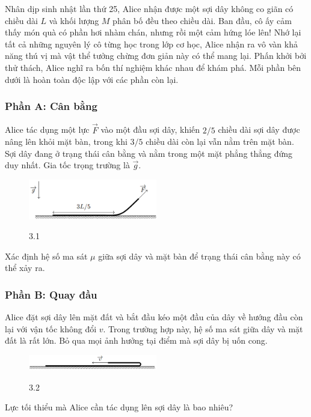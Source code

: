 \noindent Nhân dịp sinh nhật lần thứ 25, Alice nhận được một sợi dây không co giãn có chiều dài $L$ và khối lượng $M$ phân bố đều theo chiều dài. Ban đầu, cô ấy cảm thấy món quà có phần hơi nhàm chán, nhưng rồi một cảm hứng lóe lên! Nhớ lại tất cả những nguyên lý cô từng học trong lớp cơ học, Alice nhận ra vô vàn khả năng thú vị mà vật thể tưởng chừng đơn giản này có thể mang lại. Phấn khởi bởi thử thách, Alice nghĩ ra bốn thí nghiệm khác nhau để khám phá. Mỗi phần bên dưới là hoàn toàn độc lập với các phần còn lại.

\subsubsection*{Phần A: Cân bằng}
\noindent Alice tác dụng một lực $\vec{F}$ vào một đầu sợi dây, khiến $2/5$ chiều dài sợi dây được nâng lên khỏi mặt bàn, trong khi $3/5$ chiều dài còn lại vẫn nằm trên mặt bàn. Sợi dây đang ở trạng thái cân bằng và nằm trong một mặt phẳng thẳng đứng duy nhất. Gia tốc trọng trường là $\vec{g}$.
\begin{figure}[H]
  \centering
  \includegraphics[width=0.5\textwidth]{Figures/Problems/Fig 3.1.png}
  \begin{center}
    \figurename{ 3.1}
  \end{center}
\end{figure}
\vspace{-0.5cm}
\noindent Xác định hệ số ma sát $\mu$ giữa sợi dây và mặt bàn để trạng thái cân bằng này có thể xảy ra.

\subsubsection*{Phần B: Quay đầu}
\noindent Alice đặt sợi dây lên mặt đất và bắt đầu kéo một đầu của dây về hướng đầu còn lại với vận tốc không đổi $v$. Trong trường hợp này, hệ số ma sát giữa dây và mặt đất là rất lớn. Bỏ qua mọi ảnh hưởng tại điểm mà sợi dây bị uốn cong.
\begin{figure}[H]
  \centering
  \includegraphics[width=0.5\textwidth]{Figures/Problems/Fig 3.2.png}
  \begin{center}
    \figurename{ 3.2}
  \end{center}
\end{figure}
\vspace{-0.5cm}
\noindent Lực tối thiểu mà Alice cần tác dụng lên sợi dây là bao nhiêu?

